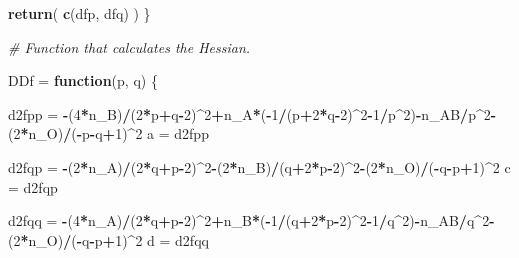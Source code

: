 \documentclass[]{article}
\newenvironment{Shaded}{\begin{snugshade}}{\end{snugshade}}
\newcommand{\KeywordTok}[1]{\textcolor[rgb]{0.13,0.29,0.53}{\textbf{#1}}}
\newcommand{\DecValTok}[1]{\textcolor[rgb]{0.00,0.00,0.81}{#1}}
\newcommand{\StringTok}[1]{\textcolor[rgb]{0.31,0.60,0.02}{#1}}
\newcommand{\CommentTok}[1]{\textcolor[rgb]{0.56,0.35,0.01}{\textit{#1}}}
\newcommand{\ControlFlowTok}[1]{\textcolor[rgb]{0.13,0.29,0.53}{\textbf{#1}}}
\newcommand{\OperatorTok}[1]{\textcolor[rgb]{0.81,0.36,0.00}{\textbf{#1}}}
\newcommand{\NormalTok}[1]{#1}
\begin{document}
\begin{Shaded}
\begin{Highlighting}[]
  \KeywordTok{return}\NormalTok{( }\KeywordTok{c}\NormalTok{(dfp, dfq) )}
\NormalTok{\}}

\CommentTok{# Function that calculates the Hessian.}

\NormalTok{DDf =}\StringTok{ }\ControlFlowTok{function}\NormalTok{(p, q) \{}
  
\NormalTok{    d2fpp =}\StringTok{ }\OperatorTok{-}\NormalTok{(}\DecValTok{4}\OperatorTok{*}\NormalTok{n_B)}\OperatorTok{/}\NormalTok{(}\DecValTok{2}\OperatorTok{*}\NormalTok{p}\OperatorTok{+}\NormalTok{q}\OperatorTok{-}\DecValTok{2}\NormalTok{)}\OperatorTok{^}\DecValTok{2}\OperatorTok{+}\NormalTok{n_A}\OperatorTok{*}\NormalTok{(}\OperatorTok{-}\DecValTok{1}\OperatorTok{/}\NormalTok{(p}\OperatorTok{+}\DecValTok{2}\OperatorTok{*}\NormalTok{q}\OperatorTok{-}\DecValTok{2}\NormalTok{)}\OperatorTok{^}\DecValTok{2}\OperatorTok{-}\DecValTok{1}\OperatorTok{/}\NormalTok{p}\OperatorTok{^}\DecValTok{2}\NormalTok{)}\OperatorTok{-}\NormalTok{n_AB}\OperatorTok{/}\NormalTok{p}\OperatorTok{^}\DecValTok{2}\OperatorTok{-}\NormalTok{(}\DecValTok{2}\OperatorTok{*}\NormalTok{n_O)}\OperatorTok{/}\NormalTok{(}\OperatorTok{-}\NormalTok{p}\OperatorTok{-}\NormalTok{q}\OperatorTok{+}\DecValTok{1}\NormalTok{)}\OperatorTok{^}\DecValTok{2}
\NormalTok{    a =}\StringTok{ }\NormalTok{d2fpp}
    
\NormalTok{    d2fqp =}\StringTok{ }\OperatorTok{-}\NormalTok{(}\DecValTok{2}\OperatorTok{*}\NormalTok{n_A)}\OperatorTok{/}\NormalTok{(}\DecValTok{2}\OperatorTok{*}\NormalTok{q}\OperatorTok{+}\NormalTok{p}\OperatorTok{-}\DecValTok{2}\NormalTok{)}\OperatorTok{^}\DecValTok{2}\OperatorTok{-}\NormalTok{(}\DecValTok{2}\OperatorTok{*}\NormalTok{n_B)}\OperatorTok{/}\NormalTok{(q}\OperatorTok{+}\DecValTok{2}\OperatorTok{*}\NormalTok{p}\OperatorTok{-}\DecValTok{2}\NormalTok{)}\OperatorTok{^}\DecValTok{2}\OperatorTok{-}\NormalTok{(}\DecValTok{2}\OperatorTok{*}\NormalTok{n_O)}\OperatorTok{/}\NormalTok{(}\OperatorTok{-}\NormalTok{q}\OperatorTok{-}\NormalTok{p}\OperatorTok{+}\DecValTok{1}\NormalTok{)}\OperatorTok{^}\DecValTok{2}
\NormalTok{    c =}\StringTok{ }\NormalTok{d2fqp    }
    
\NormalTok{    d2fqq =}\StringTok{ }\OperatorTok{-}\NormalTok{(}\DecValTok{4}\OperatorTok{*}\NormalTok{n_A)}\OperatorTok{/}\NormalTok{(}\DecValTok{2}\OperatorTok{*}\NormalTok{q}\OperatorTok{+}\NormalTok{p}\OperatorTok{-}\DecValTok{2}\NormalTok{)}\OperatorTok{^}\DecValTok{2}\OperatorTok{+}\NormalTok{n_B}\OperatorTok{*}\NormalTok{(}\OperatorTok{-}\DecValTok{1}\OperatorTok{/}\NormalTok{(q}\OperatorTok{+}\DecValTok{2}\OperatorTok{*}\NormalTok{p}\OperatorTok{-}\DecValTok{2}\NormalTok{)}\OperatorTok{^}\DecValTok{2}\OperatorTok{-}\DecValTok{1}\OperatorTok{/}\NormalTok{q}\OperatorTok{^}\DecValTok{2}\NormalTok{)}\OperatorTok{-}\NormalTok{n_AB}\OperatorTok{/}\NormalTok{q}\OperatorTok{^}\DecValTok{2}\OperatorTok{-}\NormalTok{(}\DecValTok{2}\OperatorTok{*}\NormalTok{n_O)}\OperatorTok{/}\NormalTok{(}\OperatorTok{-}\NormalTok{q}\OperatorTok{-}\NormalTok{p}\OperatorTok{+}\DecValTok{1}\NormalTok{)}\OperatorTok{^}\DecValTok{2}
\NormalTok{    d =}\StringTok{ }\NormalTok{d2fqq}
    

\end{Highlighting}
\end{Shaded}
\end{document}
